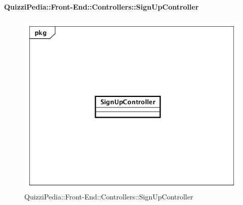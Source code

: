 \paragraph{QuizziPedia::Front-End::Controllers::SignUpController}
\begin{figure} [ht]
	\centering
	\includegraphics[scale=0.45]{UML/Classi/Front-End/QuizziPedia_Front-end_Controller_SignUpController.png}
	\caption{QuizziPedia::Front-End::Controllers::SignUpController}
\end{figure} \FloatBarrier
